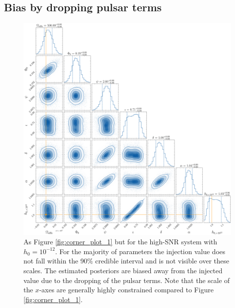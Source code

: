 \documentclass[fleqn,usenatbib,useAMS]{mnras}
\begin{document}
\subsection{Bias by dropping pulsar terms}\label{sec:bias}

\begin{figure}
	\includegraphics[width=\textwidth, height =\textwidth]{images/large_h_example}
	\caption{As Figure \ref{fig:corner_plot_1} but for the high-SNR system with $h_0 = 10^{-12}$. For the majority of parameters the injection value does not fall within the 90\% credible interval and is not visible over these scales. The estimated posteriors are biased away from the injected value due to the dropping of the pulsar terms. Note that the scale of the $x$-axes are generally highly constrained compared to Figure \ref{fig:corner_plot_1}.} 
	\label{fig:bias_for_large_h}
\end{figure}
\end{document}
